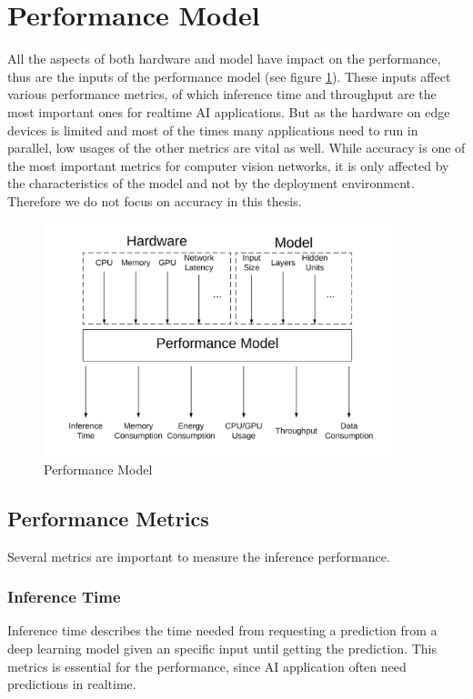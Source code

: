 \section{Performance Model}
All the aspects of both hardware and model have impact on the performance, thus are the inputs of the performance model (see figure \ref{fig:perfmodel}). These inputs affect various performance metrics, of which inference time and throughput are the most important ones for realtime AI applications. But as the hardware on edge devices is limited and most of the times many applications need to run in parallel, low usages of the other metrics are vital as well.
While accuracy is one of the most important metrics for computer vision networks, it is only affected by the characteristics of the model and not by the deployment environment. Therefore we do not focus on accuracy in this thesis.
\begin{figure}[H]
\centering
\includegraphics[width=0.9\textwidth]{./Bilder/trade_offs.png}
\caption{Performance Model}
\label{fig:perfmodel}
\end{figure}
\subsection{Performance Metrics}
Several metrics are important to measure the inference performance.
 
\subsubsection{Inference Time}
Inference time describes the time needed from requesting a prediction from a deep learning model given an specific input until getting the prediction.
This metrics is essential for the performance, since AI application often need predictions in realtime.
